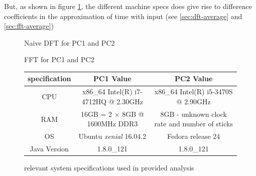 \documentclass[]{article}
\begin{document}
But, as shown in figure \ref{fig:compar6}, the different machine specs does give rise to difference coefficients in the approximation of time with input (see \ref{sec:dft-average} and \ref{sec:fft-average})
\begin{figure}
	\centering
	\begin{minipage}[b]{0.4\textwidth}
		\caption{Naive DFT for PC1 and PC2\label{fig:compar5}}
	\end{minipage}
	\hfill
	\begin{minipage}[b]{0.4\textwidth}
		\caption{FFT for PC1 and PC2\label{fig:compar6}}
	\end{minipage}
\end{figure}

\begin{figure}
	\begin{center}
		\begin{tabular}{ | c | c | c | }
			\hline
			specification & PC1 Value & PC2 Value \\
			\hline
			CPU & x86\_64 Intel(R) i7-4712HQ @ 2.30GHz & x86\_64 Intel(R) i5-3470S @ 2.90GHz\\
			\hline
			RAM & 16GB = 2 $\times$ 8GB @ 1600MHz DDR3 & 8GB - unknown clock rate and number of sticks\\ 
			\hline
			OS & Ubuntu \emph{xenial} 16.04.2 & Fedora release 24\\
			\hline
			Java Version & 1.8.0\_121 & 1.8.0\_121\\
			\hline
		\end{tabular}
	\end{center}
	\caption{relevant system specifications used in provided analysis\label{fig:specs}}
\end{figure}
\end{document}
